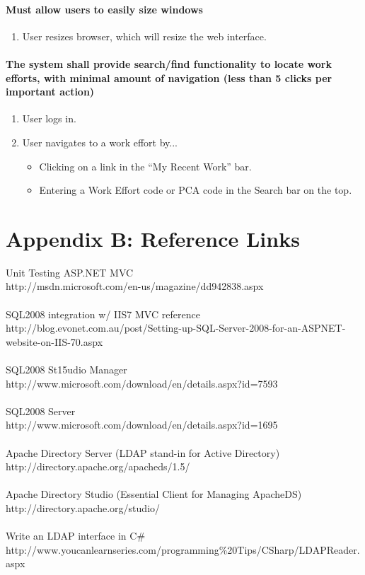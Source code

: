 \documentclass[letterpaper]{article}
\begin{document}
\paragraph{Must allow users to easily size windows}
\begin{enumerate}
\item User resizes browser, which will resize the web interface.
\end{enumerate}

\paragraph{The system shall provide search/find functionality to locate work efforts, with minimal amount of navigation (less than 5 clicks per important action)}
\begin{enumerate}
\item User logs in.
\item User navigates to a work effort by...
\begin{itemize}
  \item Clicking on a link in the ``My Recent Work'' bar.
  \item Entering a Work Effort code or PCA code in the Search bar on the top.
    \end{itemize}
\end{enumerate}

\section{Appendix B: Reference Links}
Unit Testing ASP.NET MVC\\
\small{http://msdn.microsoft.com/en-us/magazine/dd942838.aspx}\\
\\
SQL2008 integration w/ IIS7 MVC reference\\
\small{http://blog.evonet.com.au/post/Setting-up-SQL-Server-2008-for-an-ASPNET-website-on-IIS-70.aspx}\\
\\
SQL2008 St15udio Manager\\
\small{http://www.microsoft.com/download/en/details.aspx?id=7593}\\
\\
SQL2008 Server\\
\small{http://www.microsoft.com/download/en/details.aspx?id=1695}\\
\\
Apache Directory Server (LDAP stand-in for Active Directory)\\
\small{http://directory.apache.org/apacheds/1.5/}\\
\\
Apache Directory Studio (Essential Client for Managing ApacheDS)\\
\small{http://directory.apache.org/studio/}\\
\\
Write an LDAP interface in C\#\\
\small{http://www.youcanlearnseries.com/programming\%20Tips/CSharp/LDAPReader.aspx}\\
\\
\end{document}
